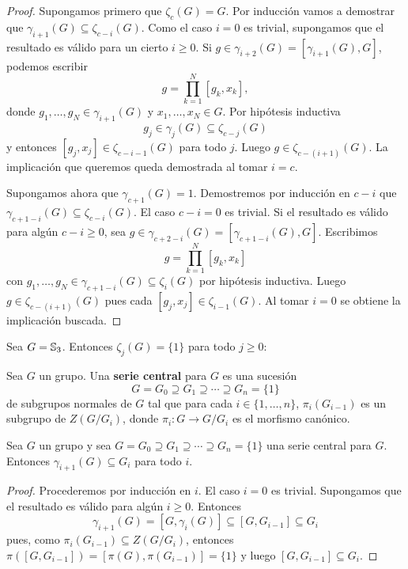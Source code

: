 \begin{proof}
	Supongamos primero que $\zeta_c(G)=G$. Por inducción vamos a demostrar
	que $\gamma_{i+1}(G)\subseteq\zeta_{c-i}(G)$.  Como el caso $i=0$ es
	trivial, supongamos que el resultado es válido para un cierto $i\geq0$. Si
	$g\in\gamma_{i+2}(G)=[\gamma_{i+1}(G),G]$, podemos escribir 
	\[
	g=\prod_{k=1}^N [g_k,x_k],
	\]
	donde $g_1,\dots,g_N\in\gamma_{i+1}(G)$ y $x_1,\dots,x_N\in G$. Por
	hipótesis inductiva 
	\[
	g_j\in\gamma_j(G)\subseteq\zeta_{c-j}(G)
	\]
	y entonces $[g_j,x_j]\in\zeta_{c-i-1}(G)$ para todo $j$. Luego
	$g\in\zeta_{c-(i+1)}(G)$. La implicación que queremos queda demostrada
	al tomar $i=c$. 

	Supongamos ahora que $\gamma_{c+1}(G)=1$. Demostremos por inducción en $c-i$ que
	$\gamma_{c+1-i}(G)\subseteq\zeta_{c-i}(G)$. El caso $c-i=0$ es trivial. Si el
	resultado es válido para algún $c-i\geq0$, sea
	$g\in\gamma_{c+2-i}(G)=[\gamma_{c+1-i}(G),G]$. Escribimos
	\[
		g=\prod_{k=1}^N[g_k,x_k]
	\]
	con $g_1,\dots,g_N\in\gamma_{c+1-i}(G)\subseteq\zeta_{i}(G)$ por
	hipótesis inductiva. Luego $g\in \zeta_{c-(i+1)}(G)$ pues cada
	$[g_j,x_j]\in\zeta_{i-1}(G)$. Al tomar $i=0$ se obtiene la implicación
	buscada.
\end{proof}

\begin{example}
	Sea $G=\mathbb{S}_3$. Entonces $\zeta_j(G)=\{1\}$ para todo $j\geq 0$: 
\end{example}

\begin{definition}
	Sea $G$ un grupo. Una \textbf{serie central} para $G$ es una sucesión 
	\[
		G=G_0\supseteq G_1\supseteq\cdots\supseteq G_n=\{1\}
	\]
	de subgrupos normales de $G$ tal que para cada $i\in\{1,\dots,n\}$, 
	$\pi_i(G_{i-1})$ es un subgrupo de $Z(G/G_i)$, donde $\pi_i\colon G\to
	G/G_i$ es el morfismo canónico.
\end{definition}

\begin{lemma}
	\label{lemma:serie_central}
	Sea $G$ un grupo y sea $G=G_0\supseteq G_1\supseteq\cdots\supseteq G_n=\{1\}$
	una serie central para $G$. Entonces $\gamma_{i+1}(G)\subseteq G_i$ para
	todo $i$.
\end{lemma}

\begin{proof}
	Procederemos por inducción en $i$. El caso $i=0$ es trivial.  Supongamos
	que el resultado es válido para algún $i\geq0$. Entonces 
	\[
	\gamma_{i+1}(G)=[G,\gamma_i(G)]\subseteq [G,G_{i-1}]\subseteq G_i
	\]
	pues, como $\pi_i(G_{i-1})\subseteq Z(G/G_{i})$, entonces
	$\pi([G,G_{i-1}])=[\pi(G),\pi(G_{i-1})]=\{1\}$ y luego $[G,G_{i-1}]\subseteq
	G_i$.
\end{proof}

